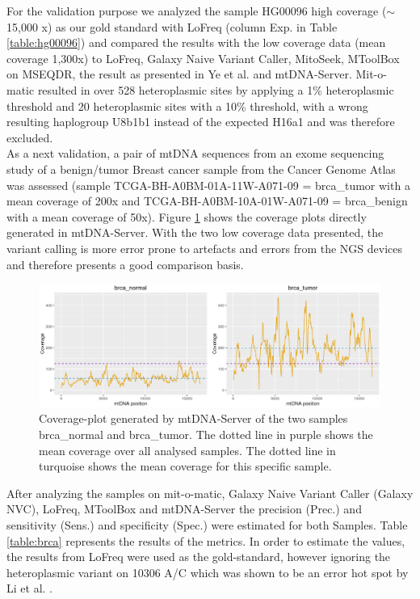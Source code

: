 For the validation purpose we analyzed the sample HG00096 high coverage ($\sim$ 15,000 x) as our gold standard with LoFreq (column Exp. in Table \ref{table:hg00096}) and compared the results with the low coverage data (mean coverage 1,300x) to LoFreq, Galaxy Naive Variant Caller, MitoSeek, MToolBox on MSEQDR, the result as presented in Ye et al. \cite{Ye2014} and mtDNA-Server.  Mit-o-matic resulted in over 528 heteroplasmic sites by applying a 1\% heteroplasmic threshold and  20 heteroplasmic sites with a 10\% threshold, with a wrong resulting haplogroup U8b1b1 instead of the expected H16a1 and was therefore excluded.\\

As a next validation, a pair of mtDNA sequences from an exome sequencing study of a benign/tumor Breast cancer sample from  the Cancer Genome Atlas \cite{Chang2013} was assessed (sample TCGA-BH-A0BM-01A-11W-A071-09 = brca\_tumor with a mean coverage of 200x and TCGA-BH-A0BM-10A-01W-A071-09 = brca\_benign with a mean coverage of 50x).
Figure \ref{fig:coverage_brca} shows the coverage plots directly generated in mtDNA-Server. With the two low coverage data presented, the variant calling is more error prone to artefacts and errors from the NGS devices and therefore presents a good comparison basis. 
\begin{figure}[!ht]
    \centering
    \includegraphics[width=1\textwidth]{images/coverage-brca.png}
    \caption[Coverage-plot generated by mtDNA-Server ]{Coverage-plot generated by mtDNA-Server of the two samples brca\_normal and brca\_tumor. The dotted line in purple shows the mean coverage over all analysed samples. The dotted line in turquoise shows the mean coverage for this specific sample.}
    \label{fig:coverage_brca}
\end{figure}
After analyzing the samples on mit-o-matic, Galaxy Naive Variant Caller (Galaxy NVC), LoFreq, MToolBox and mtDNA-Server the precision (Prec.) and sensitivity (Sens.) and specificity (Spec.) were estimated for both Samples. Table \ref{table:brca} represents the results of the metrics. In order to estimate the values, the results from LoFreq were used as the gold-standard, however ignoring the heteroplasmic variant on 10306 A/C which was shown to be an error hot spot by Li et al. \cite{Li2010}. 

